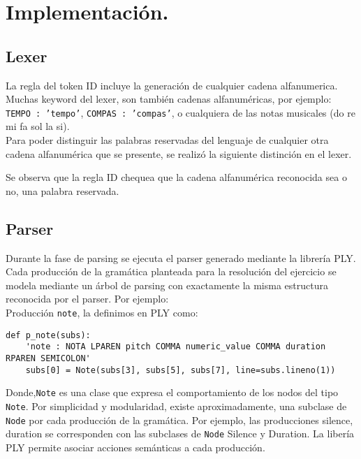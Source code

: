 \documentclass[a4paper,8pt]{article}
\begin{document}
\section{Implementación.}
\subsection{Lexer}
La regla del token ID incluye la generación de cualquier cadena alfanumerica. Muchas keyword del lexer, son también cadenas alfanuméricas, por ejemplo: \texttt{TEMPO : 'tempo'}, \texttt{COMPAS : 'compas'}, o cualquiera de las notas musicales (do re mi fa sol la si). \\Para poder distinguir las palabras reservadas del lenguaje de cualquier otra cadena alfanumérica que se presente, se realizó la siguiente distinción en el lexer. 
\begin{small}
  
\end{small}
Se observa que la regla ID chequea que la cadena alfanumérica reconocida sea o no, una palabra reservada. 

\subsection{Parser}
Durante la fase de parsing se ejecuta el parser generado mediante la librería PLY.
Cada producción de la gramática planteada para la resolución del ejercicio se modela mediante un árbol de parsing con exactamente la misma estructura reconocida por el parser. Por ejemplo:\\
Producción \texttt{note}, la definimos en PLY como:
\begin{verbatim}
def p_note(subs):
    'note : NOTA LPAREN pitch COMMA numeric_value COMMA duration RPAREN SEMICOLON'
    subs[0] = Note(subs[3], subs[5], subs[7], line=subs.lineno(1))
\end{verbatim}
Donde,\texttt{Note} es una clase que expresa el comportamiento de los nodos del tipo \texttt{Note}.
Por simplicidad y modularidad, existe aproximadamente, una subclase de \texttt{Node} por cada producción de la gramática. Por ejemplo, las producciones 
silence, duration se corresponden con las subclases de \texttt{Node} Silence y Duration. 
La libería PLY permite asociar acciones semánticas a cada producción.
\end{document}
